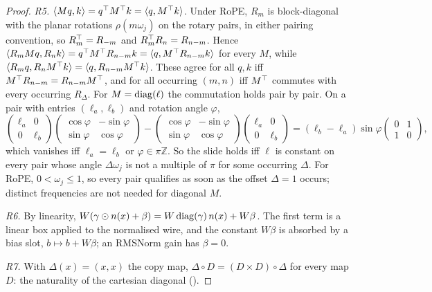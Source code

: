 \begin{proof}
\emph{R5.} $\langle Mq,k\rangle=q^{\top} M^{\top} k=\langle q,M^{\top} k\rangle$. Under RoPE, $R_m$ is block-diagonal with the planar rotations
$\rho(m\omega_j)$ on the rotary pairs, in either pairing convention, so $R_m^{\top}=R_{-m}$ and $R_m^{\top} R_n=R_{n-m}$. Hence
$\langle R_mMq,R_nk\rangle=q^{\top} M^{\top} R_{n-m}k=\langle q,M^{\top} R_{n-m}k\rangle$ for every $M$, while
$\langle R_mq,R_nM^{\top} k\rangle=\langle q,R_{n-m}M^{\top} k\rangle$. These agree for all $q,k$ iff $M^{\top} R_{n-m}=R_{n-m}M^{\top}$, and for all
occurring $(m,n)$ iff $M^{\top}$ commutes with every occurring $R_\Delta$. For $M=\operatorname{diag}(\ell)$ the commutation holds pair by pair.
On a pair with entries $(\ell_a,\ell_b)$ and rotation angle $\varphi$,
\[\begin{pmatrix}\ell_a&0\\0&\ell_b\end{pmatrix}\begin{pmatrix}\cos\varphi&-\sin\varphi\\ \sin\varphi&\cos\varphi\end{pmatrix}
-\begin{pmatrix}\cos\varphi&-\sin\varphi\\ \sin\varphi&\cos\varphi\end{pmatrix}\begin{pmatrix}\ell_a&0\\0&\ell_b\end{pmatrix}
=(\ell_b-\ell_a)\sin\varphi\begin{pmatrix}0&1\\1&0\end{pmatrix},\]
which vanishes iff $\ell_a=\ell_b$ or $\varphi\in\pi\mathbb Z$. So the slide holds iff $\ell$ is constant on every pair whose
angle $\Delta\omega_j$ is not a multiple of $\pi$ for some occurring $\Delta$. For RoPE, $0<\omega_j\le1$, so every pair
qualifies as soon as the offset $\Delta=1$ occurs; distinct frequencies are not needed for diagonal $M$.

\emph{R6.} By linearity, $W(\gamma\odot n(x)+\beta)=W\operatorname{diag}(\gamma)\,n(x)+W\beta$. The first term is a linear box applied to the
normalised wire, and the constant $W\beta$ is absorbed by a bias slot, $b\mapsto b+W\beta$; an RMSNorm gain has $\beta=0$.

\emph{R7.} With $\Delta(x)=(x,x)$ the copy map, $\Delta\circ D=(D\times D)\circ\Delta$ for every map $D$: the naturality of the
cartesian diagonal ().


\end{proof}
